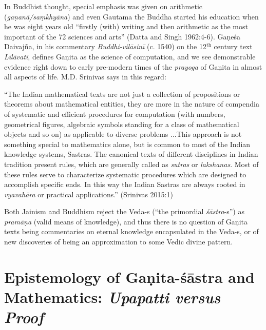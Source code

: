 In Buddhist thought, special emphasis was given on arithmetic ({\sl gaṇanā/saṃkhyāna}) and even Gautama the Buddha started his education when he was eight years old ``firstly (with) writing and then arithmetic as the most important of the 72 sciences and arts'' (Datta and Singh 1962:4-6). Gaṇeśa Daivajña, in his commentary {\sl Buddhi-vilāsinī} (c. 1540) on the 12$^{\text{th}}$ century text {\sl Līlāvatī}, defines Gaṇita as the science of computation, and we see demonstrable evidence right down to early pre-modern times of the {\sl prayoga} of Gaṇita in almost all aspects of life. M.D. Srinivas says in this regard: 
\begin{myquote}
``The Indian mathematical texts are not just a collection of propositions or theorems about mathematical entities, they are more in the nature of compendia of systematic and efficient procedures for computation (with numbers, geometrical figures, algebraic symbols standing for a class of mathematical objects and so on) as applicable to diverse problems ...This approach is not something special to mathematics alone, but is common to most of the Indian knowledge systems, Sastras. The canonical texts of different disciplines in Indian tradition present rules, which are generally called as {\sl sutras} or {\sl lakshanas}. Most of these rules serve to characterize systematic procedures which are designed to accomplish specific ends. In this way the Indian Sastras are always rooted in {\sl vyavahāra} or practical applications.''
\hfill (Srinivas 2015:1)
\end{myquote}

Both Jainism and Buddhism reject the Veda-s (``the primordial {\sl śāstra}-s'') as {\sl pramāṇa} (valid means of knowledge), and thus there is no question of Gaṇita texts being commentaries on eternal knowledge encapsulated in the Veda-s, or of new discoveries of being an approximation to some Vedic divine pattern.

\section*{Epistemology of Gaṇita-śāstra and Mathematics: {\sl\bfseries Upapatti versus Proof}}

